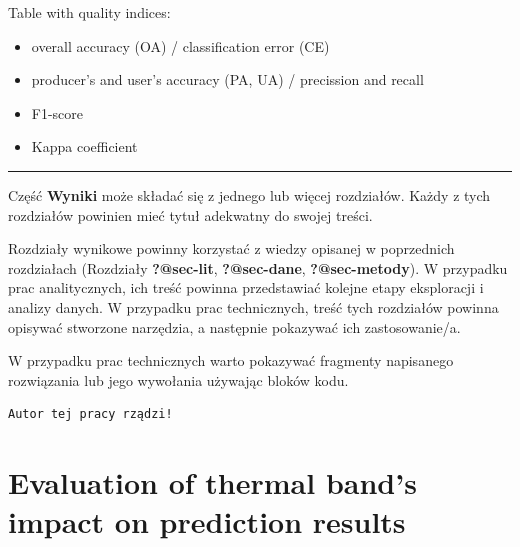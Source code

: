 \documentclass{amuthesis}
\begin{document}
Table with quality indices:

\begin{itemize}
\item
  overall accuracy (OA) / classification error (CE)
\item
  producer's and user's accuracy (PA, UA) / precission and recall
\item
  F1-score
\item
  Kappa coefficient
\end{itemize}

\begin{center}\rule{0.5\linewidth}{0.5pt}\end{center}

Część \textbf{Wyniki} może składać się z jednego lub więcej rozdziałów.
Każdy z tych rozdziałów powinien mieć tytuł adekwatny do swojej treści.

Rozdziały wynikowe powinny korzystać z wiedzy opisanej w poprzednich
rozdziałach (Rozdziały \textbf{?@sec-lit}, \textbf{?@sec-dane},
\textbf{?@sec-metody}). W przypadku prac analitycznych, ich treść
powinna przedstawiać kolejne etapy eksploracji i analizy danych. W
przypadku prac technicznych, treść tych rozdziałów powinna opisywać
stworzone narzędzia, a następnie pokazywać ich zastosowanie/a.

W przypadku prac technicznych warto pokazywać fragmenty napisanego
rozwiązania lub jego wywołania używając bloków kodu.

\begin{Shaded}
\begin{Highlighting}[]
\OtherTok{=} 
  \NormalTok{)}
\NormalTok{\}}
\NormalTok{(}\NormalTok{)}
\end{Highlighting}
\end{Shaded}

\begin{verbatim}
Autor tej pracy rządzi!
\end{verbatim}


\hypertarget{sec-results-therm}{%
\chapter{Evaluation of thermal band's impact on prediction
results}\label{sec-results-therm}}
\end{document}

